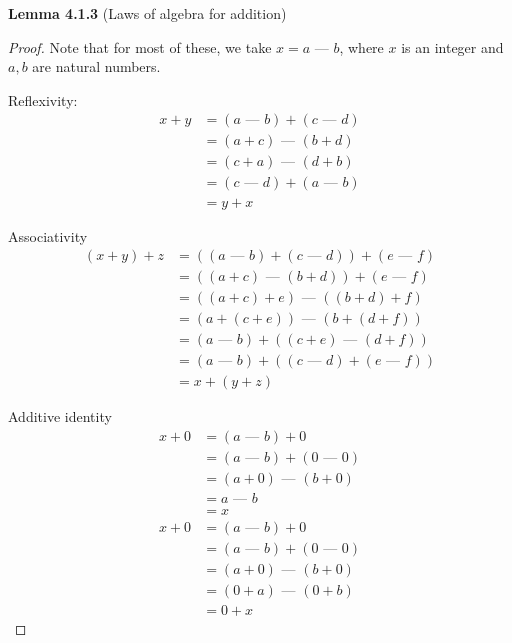 \documentclass[answers,12pt]{exam}
\newcommand{\fakeminus}{\text{ --- }}
\begin{document}
\textbf{Lemma 4.1.3} (Laws of algebra for addition)

\begin{solution}
\begin{proof}
    Note that for most of these, we take $x = a \fakeminus b$, where $x$ is an integer and $a,b$ are natural numbers.

    Reflexivity:
    \begin{align*}
        x+y &= (a \fakeminus b) + (c \fakeminus d) \\
        &= (a+c) \fakeminus (b+d) \\
        &= (c+a) \fakeminus (d+b) \\
        &= (c \fakeminus d) + (a \fakeminus b) \\
        &= y+x
    \end{align*}

    Associativity
    \begin{align*}
        (x+y)+z &= ((a \fakeminus b) + (c \fakeminus d)) + (e \fakeminus f) \\
        &= ((a+c) \fakeminus (b+d)) + (e \fakeminus f) \\
        &= ((a+c)+e) \fakeminus ((b+d)+f) \\
        &= (a+(c+e)) \fakeminus (b+(d+f)) \\
        &= (a \fakeminus b) + ((c+e) \fakeminus (d+f)) \\
        &= (a \fakeminus b) + ((c \fakeminus d) + (e \fakeminus f)) \\
        &= x + (y+z)
    \end{align*}

    Additive identity
    \begin{align*}
        x+0 &= (a \fakeminus b) + 0 \\
        &= (a \fakeminus b) + (0 \fakeminus 0) \\
        &= (a+0) \fakeminus (b+0) \\
        &= a \fakeminus b \\
        &= x
    \end{align*}
    \begin{align*}
        x+0 &= (a \fakeminus b) + 0 \\
        &= (a \fakeminus b) + (0 \fakeminus 0) \\
        &= (a+0) \fakeminus (b+0) \\
        &= (0+a) \fakeminus (0+b) \\
        &= 0 + x
    \end{align*}


\end{proof}
\end{solution}
\end{document}
